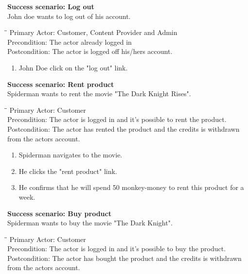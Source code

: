 \textbf{Success scenario: Log out} \\
John doe wants to log out of his account. 
\begin{tabbing}
\hspace{5mm}\=\hspace{26mm}\=\kill
\>Primary Actor:\> Customer, Content Provider and Admin\\
\>Precondition:\> The actor already logged in\\
\>Postcondition:\> The actor is logged off his/hers account.
\end{tabbing}
\begin{enumerate} \setlength{\itemsep}{-1mm}
	\item John Doe click on the "log out" link.
\end{enumerate}
\vspace{3mm}
\textbf{Success scenario: Rent product} \\
Spiderman wants to rent the movie "The Dark Knight Rises". 
\begin{tabbing}
\hspace{5mm}\=\hspace{26mm}\=\kill
\>Primary Actor:\> Customer\\
\>Precondition:\> The actor is logged in and it's possible to rent the product.\\
\>Postcondition:\> The actor has rented the product and the credits is withdrawn from the actors account.
\end{tabbing}
\begin{enumerate} \setlength{\itemsep}{-1mm}
	\item Spiderman navigates to the movie.
	\item He clicks the "rent product" link.
	\item He confirms that he will spend 50 monkey-money to rent this product for a week.
\end{enumerate}
\vspace{3mm}
\textbf{Success scenario: Buy product} \\
Spiderman wants to buy the movie "The Dark Knight". 
\begin{tabbing}
\hspace{5mm}\=\hspace{26mm}\=\kill
\>Primary Actor:\> Customer\\
\>Precondition:\> The actor is logged in and it's possible to buy the product.\\
\>Postcondition:\> The actor has bought the product and the credits is withdrawn from the actors account.
\end{tabbing}
